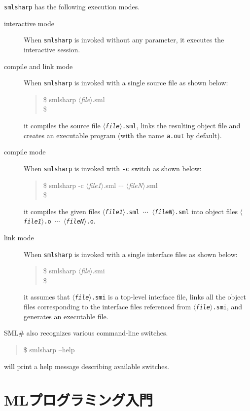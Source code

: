 \documentclass{jbook}
\newcommand{\txt}[2]{#1}
\newcommand{\smlsharp}{SML\#}
\newcommand{\nonterm}[1]{\mbox{$\langle$}{\it #1}\mbox{$\rangle$}}
\newenvironment{program}{\begin{quote}\begin{tt}}%
                        {\end{tt}\end{quote}}
\begin{document}
\else%
	{\tt smlsharp} has the following execution modes.
\begin{description}
\item[interactive mode]
When {\tt smlsharp} is invoked without any parameter,
it executes the interactive session.
\item[compile and link mode]
When {\tt smlsharp} is invoked with a single source file as shown below:
\begin{program}
\$ smlsharp \nonterm{file}.sml\\
\$ 
\end{program}
it compiles the source file {\tt \nonterm{file}.sml}, links the resulting
object file and creates an executable program (with the name {\tt a.out}
by default).
\item[compile mode]
When {\tt smlsharp} is invoked with {\tt -c} switch as shown below:
\begin{program}
\$ smlsharp -c \nonterm{file1}.sml $\cdots$ \nonterm{fileN}.sml \\
\$ 
\end{program}
it compiles the given files {\tt \nonterm{file1}.sml $\cdots$
\nonterm{fileN}.sml}
into object files {\tt \nonterm{file1}.o $\cdots$
\nonterm{fileN}.o}.
\item[link mode]
When {\tt smlsharp} is invoked with a single interface files as shown below:
\begin{program}
\$ smlsharp \nonterm{file}.smi \\
\$ 
\end{program}
it assumes that {\tt \nonterm{file}.smi} is a top-level interface file,
links all the object files corresponding to the interface files
referenced from {\tt \nonterm{file}.smi}, 
and generates an executable file.
\end{description}
	\smlsharp{} also recognizes various command-line switches.
\begin{program}
\$ smlsharp --help
\end{program}
will print a help message describing available switches.
\fi%

\chapter{\txt{MLプログラミング入門}{Introduction to ML programming}}
\label{chap:tutorialMlprogramming}
\end{document}
